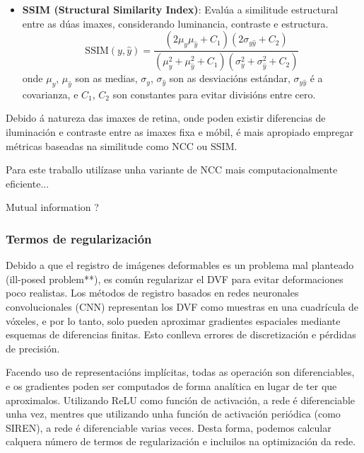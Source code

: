 \begin{itemize}
    \item \textbf{SSIM (Structural Similarity Index)}:
    Evalúa a similitude estructural entre as dúas imaxes, considerando luminancia, contraste e estructura.
    \[
    \text{SSIM}(y, \hat{y}) = \frac{(2\mu_y\mu_{\hat{y}} + C_1)(2\sigma_{y\hat{y}} + C_2)}{(\mu_y^2 + \mu_{\hat{y}}^2 + C_1)(\sigma_y^2 + \sigma_{\hat{y}}^2 + C_2)}
    \]
    onde \( \mu_y \), \( \mu_{\hat{y}} \) son as medias, \( \sigma_y \), \( \sigma_{\hat{y}} \) son as desviacións estándar, \( \sigma_{y\hat{y}} \) é a covarianza, e \( C_1 \), \( C_2 \) son constantes para evitar divisións entre cero. \cite{Palubinskas02012017}
\end{itemize}

Debido á natureza das imaxes de retina, onde poden existir diferencias de iluminación e contraste entre as imaxes fixa e móbil, 
é mais apropiado empregar métricas baseadas na similitude como NCC ou SSIM.

Para este traballo utilízase unha variante de NCC mais computacionalmente eficiente...

Mutual information ?

\subsubsection{Termos de regularización}
\label{subsubsec:Termos de regularización}

Debido a que el registro de imágenes deformables es un problema mal planteado (ill-posed problem**), 
es común regularizar el DVF para evitar deformaciones poco realistas.
 Los métodos de registro basados en redes neuronales convolucionales (CNN) representan los DVF 
 como muestras en una cuadrícula de vóxeles, e por lo tanto, solo pueden aproximar gradientes espaciales
 mediante esquemas de diferencias finitas. Esto conlleva errores de discretización e pérdidas de precisión.

Facendo uso de representacións implícitas, todas as operación son diferenciables, e os gradientes poden
 ser computados de forma analítica en lugar de ter que aproximalos.
Utilizando ReLU como función de activación, a rede é diferenciable unha vez, mentres que utilizando
 unha función de activación periódica (como SIREN), a rede é diferenciable varias veces.
Desta forma, podemos calcular calquera número de termos de regularización e incluilos na optimización da rede.

